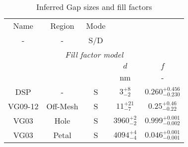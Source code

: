 \begin{table}[h!]
\caption{Inferred Gap sizes and fill factors \label{tbl_DerivedGapSizes}}
\begin{center}
    \begin{tabular}{ c c c c c }
    \hline
    Name & Region & Mode &  &  \\
    -  & - & S/D &  &  \\
    \hline
    \multicolumn{5}{c}{\emph{Fill factor model}} \\
    \hline
    \multicolumn{3}{c}{} & $d$ & $f$ \\
    \multicolumn{3}{c}{} & nm & - \\
    \cline{4-5}
    DSP & -    &   S  & $3^{+8}_{-2}$ & $0.260^{+0.456}_{-0.230}$\\
    VG09-12 & Off-Mesh    &   S  & $11^{+21}_{-7}$ & $0.25^{+0.46}_{-0.22}$\\
    VG03 & Hole    &   S  & $3960^{+2}_{-2}$ &  $0.999^{+0.001}_{-0.002}$\\
    VG03 & Petal   &   S  & $4094^{+4}_{-4}$ &  $0.046^{+0.001}_{-0.001}$\\
    \hline
    \end{tabular}
\end{center}
\end{table}